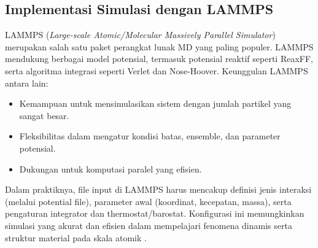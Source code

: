\subsection{Implementasi Simulasi dengan LAMMPS}
LAMMPS (\emph{Large-scale Atomic/Molecular Massively Parallel Simulator}) merupakan salah satu paket perangkat lunak MD yang paling populer.
LAMMPS mendukung berbagai model potensial, termasuk potensial reaktif seperti ReaxFF, serta algoritma integrasi seperti Verlet dan Nose-Hoover.
Keunggulan LAMMPS antara lain:
\begin{itemize}
    \item Kemampuan untuk mensimulasikan sistem dengan jumlah partikel yang sangat besar.
    \item Fleksibilitas dalam mengatur kondisi batas, ensemble, dan parameter potensial.
    \item Dukungan untuk komputasi paralel yang efisien.
\end{itemize}
Dalam praktiknya, file input di LAMMPS harus mencakup definisi jenis interaksi (melalui potential file), parameter awal (koordinat, kecepatan, massa), serta pengaturan integrator dan thermostat/barostat.
Konfigurasi ini memungkinkan simulasi yang akurat dan efisien dalam mempelajari fenomena dinamis serta struktur material pada skala atomik \cite{Plimpton1995}.

